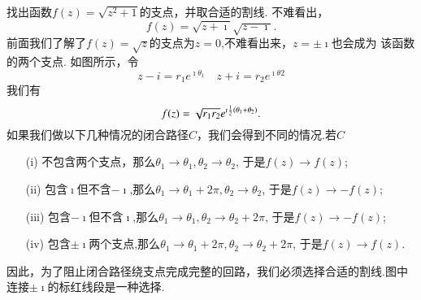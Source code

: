 \begin{examplebox}{找出函数$f(z) = \sqrt{z^2 + 1}$的支点，并取合适的割线.}
不难看出，
\[
  f(z) = \sqrt{z + \imath} \sqrt{z-\imath} .
\]
前面我们了解了$f(z)=\sqrt{z}$的支点为$z=0$,不难看出来，$z=\pm \imath$也会成为
该函数的两个支点.
如图所示，令
\[ z - i = r_1 e^{\imath \theta_1 } \quad 
    z + i = r_2 e^{\imath \theta 2}
\]
我们有\[f(z) = \sqrt{r_1 r_2} e^{\imath {\frac{1}{2}} (\theta_1 + \theta_2)}.\]
如果我们做以下几种情况的闭合路径$C$，我们会得到不同的情况.若$C$
\begin{enumerate}
    \item[(i)] 不包含两个支点，那么$\theta_1 \to \theta_1, \theta_2 \to \theta_2$, 于是$f(z)\to f(z)$;
    \item[(ii)] 包含$\imath$但不含$-\imath$,那么$\theta_1 \to \theta_1 + 2\pi, \theta_2 \to \theta_2$, 于是$f(z)\to - f(z)$;
    \item[(iii)] 包含$-\imath$但不含$\imath$,那么$\theta_1 \to \theta_1, \theta_2 \to \theta_2  + 2\pi$, 于是$f(z)\to - f(z)$;
    \item[(iv)] 包含$\pm \imath$两个支点,那么$\theta_1 \to \theta_1  + 2\pi, \theta_2 \to \theta_2  + 2\pi$, 于是$f(z)\to  f(z)$.
\end{enumerate}
    \centering
    
因此，为了阻止闭合路径绕支点完成完整的回路，我们必须选择合适的割线.图中连接$\pm \imath$的标红线段是一种选择.
\end{examplebox}